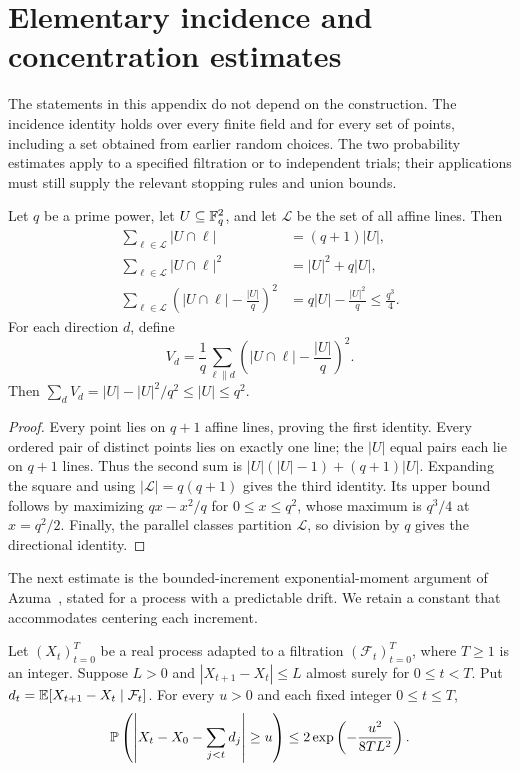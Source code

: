\section{Elementary incidence and concentration estimates}
\label{sec:elementary}

The statements in this appendix do not depend on the construction.
The incidence identity holds over every finite field and for every set
of points, including a set obtained from earlier random choices. The two
probability estimates apply to a specified filtration or to independent
trials; their applications must still supply the relevant stopping rules
and union bounds.

\begin{lemma}\label{lem:affine-second-moment}
Let $q$ be a prime power, let $U\subseteq\mathbb F_q^2$, and let $\mathcal L$
be the set of all affine lines. Then
\begin{align*}
 \sum_{\ell\in\mathcal L}|U\cap\ell|&=(q+1)|U|,\\
 \sum_{\ell\in\mathcal L}|U\cap\ell|^2&=|U|^2+q|U|,\\
 \sum_{\ell\in\mathcal L}\left(|U\cap\ell|-\frac{|U|}{q}\right)^2
 &=q|U|-\frac{|U|^2}{q}\le\frac{q^3}{4}.
\end{align*}
For each direction $d$, define
\[
 V_d=\frac1q\sum_{\ell\parallel d}
       \left(|U\cap\ell|-\frac{|U|}{q}\right)^2.
\]
Then $\sum_d V_d=|U|-|U|^2/q^2\le |U|\le q^2$.
\end{lemma}

\begin{proof}
Every point lies on $q+1$ affine lines, proving the first identity.
Every ordered pair of distinct points lies on exactly one line; the
$|U|$ equal pairs each lie on $q+1$ lines. Thus the second sum is
$|U|(|U|-1)+(q+1)|U|$. Expanding the square and using
$|\mathcal L|=q(q+1)$ gives the third identity. Its upper bound follows
by maximizing $qx-x^2/q$ for $0\le x\le q^2$, whose maximum is
$q^3/4$ at $x=q^2/2$. Finally, the parallel classes partition
$\mathcal L$, so division by $q$ gives the directional identity.
\end{proof}

The next estimate is the bounded-increment exponential-moment argument
of Azuma~\cite{Azuma1967}, stated for a process with a predictable drift.
We retain a constant that accommodates centering each increment.

\begin{lemma}
\label{lem:bounded-drift-concentration}
Let $(X_t)_{t=0}^T$ be a real process adapted to a filtration
$(\mathcal F_t)_{t=0}^T$, where $T\ge1$ is an integer. Suppose $L>0$
and $|X_{t+1}-X_t|\le L$ almost surely for $0\le t<T$. Put
$d_t=\mathbb E[X_{t+1}-X_t\mid\mathcal F_t]$. For every $u>0$ and each
fixed integer $0\le t\le T$,
\[
 \mathbb P\left(\left|X_t-X_0-\sum_{j<t}d_j\right|\ge u\right)
 \le2\exp\left(-\frac{u^2}{8TL^2}\right).
\]
\end{lemma}

